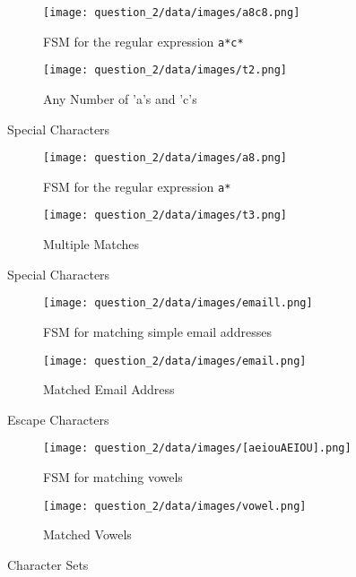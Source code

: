 \documentclass[12pt]{report}
\begin{document}
\begin{figure}[H]
    \centering
    \begin{subfigure}{0.4\textwidth}
        \texttt{[image: question\_2/data/images/a8c8.png]}
        \caption{FSM for the regular expression \texttt{a*c*}}
    \end{subfigure}
    \begin{subfigure}{0.5\textwidth}
        \texttt{[image: question\_2/data/images/t2.png]}
        \caption{Any Number of 'a's and 'c's}
    \end{subfigure}
    \caption{Special Characters}
\end{figure}

\begin{figure}[H]
    \centering
    \begin{subfigure}{0.4\textwidth}
        \texttt{[image: question\_2/data/images/a8.png]}
        \caption{FSM for the regular expression \texttt{a*}}
    \end{subfigure}
    \begin{subfigure}{0.5\textwidth}
        \texttt{[image: question\_2/data/images/t3.png]}
        \caption{Multiple Matches}
    \end{subfigure}
    \caption{Special Characters}
\end{figure}

\begin{figure}[H]
    \centering
    \begin{subfigure}{0.7\textwidth}
        \texttt{[image: question\_2/data/images/emaill.png]}
        \caption{FSM for matching simple email addresses}
    \end{subfigure}
    \begin{subfigure}{0.7\textwidth}
        \texttt{[image: question\_2/data/images/email.png]}
        \caption{Matched Email Address}
    \end{subfigure}
    \caption{Escape Characters}
\end{figure}

\begin{figure}[H]
    \centering
    \begin{subfigure}{0.4\textwidth}
        \texttt{[image: question\_2/data/images/[aeiouAEIOU].png]}
        \caption{FSM for matching vowels}
    \end{subfigure}
    \begin{subfigure}{0.5\textwidth}
        \texttt{[image: question\_2/data/images/vowel.png]}
        \caption{Matched Vowels}
    \end{subfigure}
    \caption{Character Sets}
\end{figure}
\end{document}
